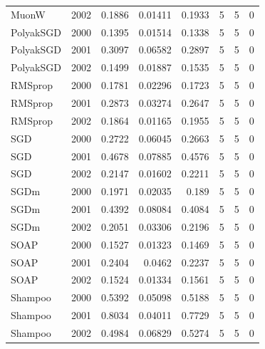 \begin{tabular}{lrrrrrrr}
MuonW & 2002 & 0.1886 & 0.01411 & 0.1933 & 5 & 5 & 0 \\
PolyakSGD & 2000 & 0.1395 & 0.01514 & 0.1338 & 5 & 5 & 0 \\
PolyakSGD & 2001 & 0.3097 & 0.06582 & 0.2897 & 5 & 5 & 0 \\
PolyakSGD & 2002 & 0.1499 & 0.01887 & 0.1535 & 5 & 5 & 0 \\
RMSprop & 2000 & 0.1781 & 0.02296 & 0.1723 & 5 & 5 & 0 \\
RMSprop & 2001 & 0.2873 & 0.03274 & 0.2647 & 5 & 5 & 0 \\
RMSprop & 2002 & 0.1864 & 0.01165 & 0.1955 & 5 & 5 & 0 \\
SGD & 2000 & 0.2722 & 0.06045 & 0.2663 & 5 & 5 & 0 \\
SGD & 2001 & 0.4678 & 0.07885 & 0.4576 & 5 & 5 & 0 \\
SGD & 2002 & 0.2147 & 0.01602 & 0.2211 & 5 & 5 & 0 \\
SGDm & 2000 & 0.1971 & 0.02035 & 0.189 & 5 & 5 & 0 \\
SGDm & 2001 & 0.4392 & 0.08084 & 0.4084 & 5 & 5 & 0 \\
SGDm & 2002 & 0.2051 & 0.03306 & 0.2196 & 5 & 5 & 0 \\
SOAP & 2000 & 0.1527 & 0.01323 & 0.1469 & 5 & 5 & 0 \\
SOAP & 2001 & 0.2404 & 0.0462 & 0.2237 & 5 & 5 & 0 \\
SOAP & 2002 & 0.1524 & 0.01334 & 0.1561 & 5 & 5 & 0 \\
Shampoo & 2000 & 0.5392 & 0.05098 & 0.5188 & 5 & 5 & 0 \\
Shampoo & 2001 & 0.8034 & 0.04011 & 0.7729 & 5 & 5 & 0 \\
Shampoo & 2002 & 0.4984 & 0.06829 & 0.5274 & 5 & 5 & 0 \\
\bottomrule
\end{tabular}
